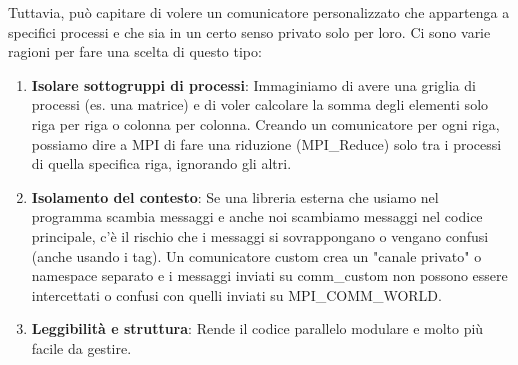 Tuttavia, può capitare di volere un comunicatore personalizzato che appartenga a specifici processi e che sia in un certo senso privato solo per loro. Ci sono varie ragioni per fare una scelta di questo tipo:
\begin{enumerate}
    \item \textbf{Isolare sottogruppi di processi}: Immaginiamo di avere una griglia di processi (es. una matrice) e di voler calcolare la somma degli elementi solo riga per riga o colonna per colonna. Creando un comunicatore per ogni riga, possiamo dire a MPI di fare una riduzione (MPI\_Reduce) solo tra i processi di quella specifica riga, ignorando gli altri.
    \item \textbf{Isolamento del contesto}: Se una libreria esterna che usiamo nel programma scambia messaggi e anche noi scambiamo messaggi nel codice principale, c'è il rischio che i messaggi si sovrappongano o vengano confusi (anche usando i tag). Un comunicatore custom crea un "canale privato" o namespace separato e i messaggi inviati su comm\_custom non possono essere intercettati o confusi con quelli inviati su MPI\_COMM\_WORLD.
    \item \textbf{Leggibilità e struttura}: Rende il codice parallelo modulare e molto più facile da gestire.
\end{enumerate}


